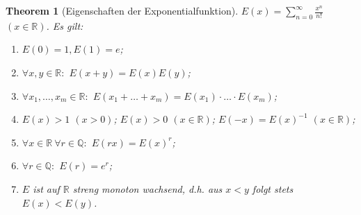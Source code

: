 \documentclass[12pt]{extreport} %
\newcommand{\Q}{\mathbb{Q}}
\newcommand{\R}{\mathbb{R}}
\theoremstyle{named}
\newtheorem{unnamedtheorem}{Theorem} \counterwithin{unnamedtheorem}{chapter}
\theoremstyle{itshape}
\theoremstyle{normal}
\begin{document}
\begin{unnamedtheorem}[Eigenschaften der Exponentialfunktion] \label{3.12:prop-Exponentialfunktion}
	$E(x) = \sum_{n=0}^{\infty} \frac{x^{n}}{n!}$ $(x \in \R)$. Es gilt:
	\begin{enumerate}
		\item $E(0) = 1, E(1) = e$;
		\item $\forall x, y \in \R:$ $E(x + y) = E(x) E(y)$;
		\item $\forall x_{1}, \dotsc, x_{m} \in \R:$ $E(x_{1} + \dotsc + x_{m}) = E(x_{1}) \cdot \dotsc \cdot E(x_{m})$;
		\item $E(x) > 1$ $(x > 0)$; $E(x) > 0$ $(x \in \R)$; $E(-x) = E(x)^{-1}$ $(x \in \R)$;
		\item $\forall x \in \R ~ \forall r \in \Q:$ $E(rx) = E(x)^{r}$;
		\item $\forall r \in \Q:$ $E(r) = e^{r}$;
		\item $E$ ist auf $\R$ streng monoton wachsend, d.h. aus $x < y$ folgt stets $E(x) < E(y)$.
	\end{enumerate}	
\end{unnamedtheorem}
\end{document}
